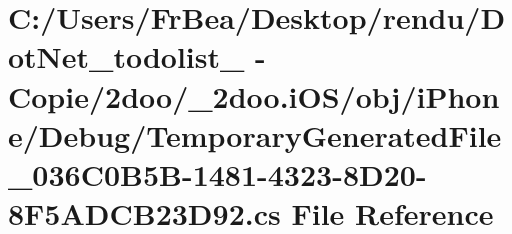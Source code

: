 \hypertarget{i_o_s_2obj_2i_phone_2_debug_2_temporary_generated_file__036_c0_b5_b-1481-4323-8_d20-8_f5_a_d_c_b23_d92_8cs}{
\section{C:/Users/FrBea/Desktop/rendu/DotNet\_\-todolist\_ - Copie/2doo/\_\-2doo.iOS/obj/iPhone/Debug/TemporaryGeneratedFile\_\-036C0B5B-1481-4323-8D20-8F5ADCB23D92.cs File Reference}
\label{i_o_s_2obj_2i_phone_2_debug_2_temporary_generated_file__036_c0_b5_b-1481-4323-8_d20-8_f5_a_d_c_b23_d92_8cs}
}
